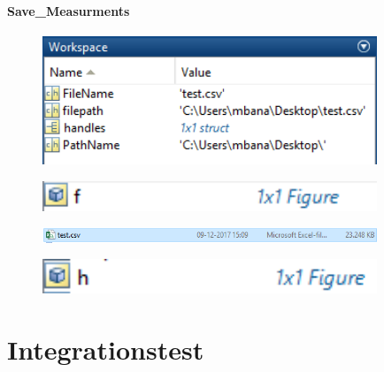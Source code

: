 \subsubsection{Save\_Measurments} 


\begin{figure}[H] 
\centering
{\includegraphics[width=10cm]
{Figure/modultestsave1}}
\caption{}
\label{fig:modultestsave1}
\end{figure}

\begin{figure}[H] 
\centering
{\includegraphics[width=10cm]
{Figure/modultestsave2}}
\caption{}
\label{fig:modultestsave1}
\end{figure}

\begin{figure}[H] 
\centering
{\includegraphics[width=10cm]
{Figure/modultestsave3}}
\caption{}
\label{fig:modultestsave1}
\end{figure}

\begin{figure}[H] 
\centering
{\includegraphics[width=10cm]
{Figure/modultestsave4}}
\caption{}
\label{fig:modultestsave1}
\end{figure}


\chapter{Integrationstest}


